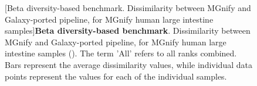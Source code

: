 \begin{figure}[H]
  \centering
  \hfill
  [Beta diversity-based benchmark. Dissimilarity between MGnify and Galaxy-ported pipeline, for MGnify human large intestine samples]{\textbf{Beta diversity-based benchmark}. Dissimilarity between MGnify and Galaxy-ported pipeline, for MGnify human large intestine samples (). The term 'All' refers to all ranks combined. Bars represent the average dissimilarity values, while individual data points represent the values for each of the individual samples.} \label{fig:mgnify_human_gut_beta_div}%
\end{figure}

